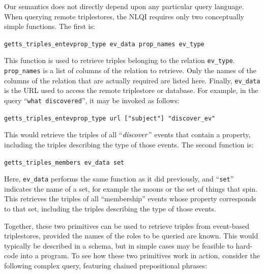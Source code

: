 \documentclass[../main.tex]{subfiles}
\begin{document}
\begin{refsection}
Our semantics does not directly depend upon any particular query language.
When querying remote triplestores, the NLQI requires only two conceptually simple functions.  The first is:

\examplespacing

\texttt{getts\_triples\_entevprop\_type ev\_data prop\_names ev\_type}

\examplespacing

\noindent This function is used to retrieve triples belonging to the relation \texttt{ev\_type}.  \texttt{prop\_names} is a list of columns of the relation to retrieve.  Only the names of the columns of the relation that are actually required are listed here.  Finally, \linebreak \texttt{ev\_data} is the URL used to access the remote triplestore or database.  For example, in the query ``\texttt{what discovered}'', it may be invoked as follows:


\examplespacing

\texttt{getts\_triples\_entevprop\_type url ["subject"] "discover\_ev"}

\examplespacing

\noindent This would retrieve the triples of all ``$\operatorname{\mathit{discover}}$'' events that contain a  property, including the triples describing the type of those events.  The second function is:

\examplespacing

\texttt{getts\_triples\_members ev\_data set}

\examplespacing

\noindent Here, \texttt{ev\_data} performs the same function as it did previously, and ``\texttt{set}'' indicates the name of a set, for example the moons or the set of things that spin.  This retrieves the triples of all ``membership'' events whose  property corresponds to that set, including the triples describing the type of those events.

Together, these two primitives can be used to retrieve triples from event-based triplestores, provided the names of the roles to be queried are known.  This would typically be described in a schema, but in simple cases may be feasible to hard-code into a program. To see how these two primitives work in action, consider the following complex query, featuring chained prepositional phrases:


\end{refsection}
\end{document}
